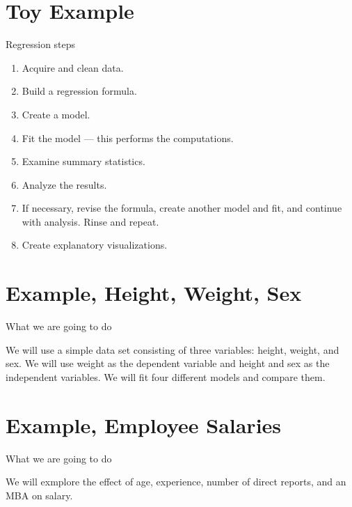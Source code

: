 \documentclass{beamer}
\begin{document}
\section{Toy Example}

\begin{frame}
    \LARGE Regression steps

    \normalsize
    
    \begin{enumerate}
            \setlength\itemsep{1em}
\item Acquire and clean data.
\item Build a regression formula.
\item Create a model.
\item Fit the model --- this performs the computations.
\item Examine summary statistics.
\item Analyze the results.
\item If necessary, revise the formula, create another model and fit, and continue with analysis. Rinse and repeat.
\item Create explanatory visualizations.
    \end{enumerate}
\end{frame}


\section{Example, Height, Weight, Sex}

\begin{frame}
    \LARGE What we are going to do

    \normalsize
We will use a simple data set consisting of three variables: height, weight, and sex. We will use weight as the dependent variable and height and sex as the independent variables. We will fit four different models and compare them. 
\end{frame}

\section{Example, Employee Salaries}

\begin{frame}
    \LARGE What we are going to do

    \normalsize
    We will exmplore the effect of age, experience, number of direct reports, and an MBA on salary.
    
\end{frame}
\end{document}
